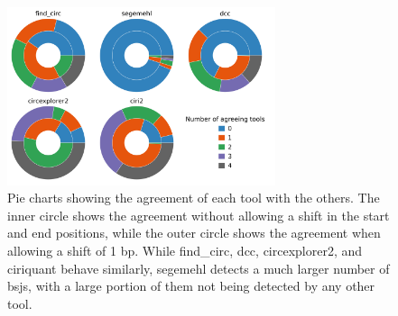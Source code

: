 \begin{figure}[ht] \centering

    \includegraphics[width=0.7\textwidth]{chapters/4_results_and_discussion/figures/detection/pies.png}
    \caption{Pie charts showing the agreement of each tool with the others.
        The inner circle shows the agreement without allowing a shift in the start and
        end positions, while the outer circle shows the agreement when allowing a shift
        of 1 bp.
        While find\_circ, dcc, circexplorer2, and ciriquant behave similarly, segemehl
        detects a much larger number of \gls{bsj}s, with a large portion of them not
        being detected by any other tool.
    }
    \label{fig:detection_pies}
\end{figure}

